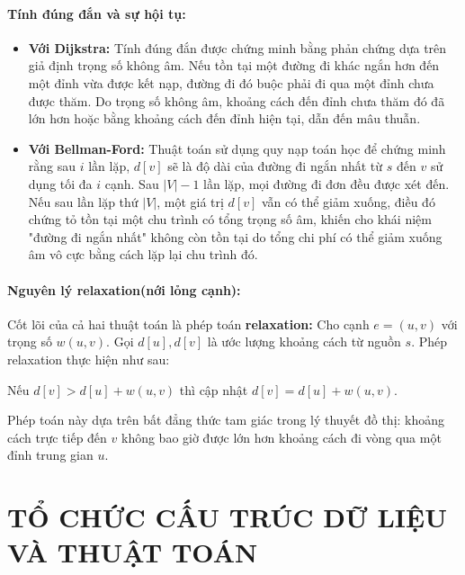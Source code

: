 \documentclass[14pt,a4paper]{report}
\begin{document}
\vspace{50pt}

\subsubsection{Tính đúng đắn và sự hội tụ:}
\justifying\fontsize{12pt}{13pt}\selectfont
\begin{itemize}
    \item \textbf{Với Dijkstra:}  Tính đúng đắn được chứng minh bằng phản chứng dựa trên giả định trọng số không âm. Nếu tồn tại một đường đi khác ngắn hơn đến một đỉnh vừa được kết nạp, đường đi đó buộc phải đi qua một đỉnh chưa được thăm. Do trọng số không âm, khoảng cách đến đỉnh chưa thăm đó đã lớn hơn hoặc bằng khoảng cách đến đỉnh hiện tại, dẫn đến mâu thuẫn.
    \vspace{2.5pt}

    \item \textbf{Với Bellman-Ford:} Thuật toán sử dụng quy nạp toán học để chứng minh rằng sau $i$ lần lặp, $d[v]$ sẽ là độ dài của đường đi ngắn nhất từ $s$ đến $v$ sử dụng tối đa $i$ cạnh. Sau $|V|-1$ lần lặp, mọi đường đi đơn đều được xét đến. Nếu sau lần lặp thứ $|V|$, một giá trị $d[v]$ vẫn có thể giảm xuống, điều đó chứng tỏ tồn tại một chu trình có tổng trọng số âm, khiến cho khái niệm "đường đi ngắn nhất" không còn tồn tại do tổng chi phí có thể giảm xuống âm vô cực bằng cách lặp lại chu trình đó.
\end{itemize}

\subsubsection{Nguyên lý relaxation(nới lỏng cạnh): }
\justifying\fontsize{12pt}{13pt}\selectfont
Cốt lõi của cả hai thuật toán là phép toán \textbf{relaxation:} Cho cạnh $e = (u, v)$ với trọng số $w(u, v)$. Gọi $d[u], d[v]$ là ước lượng khoảng cách từ nguồn $s$. Phép relaxation thực hiện như sau:
\begin{center}
    Nếu $d[v] > d[u] + w(u, v)$ thì cập nhật $d[v] = d[u] + w(u, v)$.
\end{center}
Phép toán này dựa trên bất đẳng thức tam giác trong lý thuyết đồ thị: khoảng cách trực tiếp đến $v$ không bao giờ được lớn hơn khoảng cách đi vòng qua một đỉnh trung gian $u$.






\chapter{TỔ CHỨC CẤU TRÚC DỮ LIỆU VÀ THUẬT TOÁN}
\justifying\fontsize{12pt}{13pt}\selectfont
\end{document}
